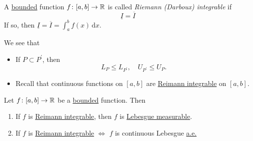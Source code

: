 \begin{definition}\label{def:Riemann-integrable}
	A \underline{bounded} function \(f\colon [a, b]\to \mathbb{\MakeUppercase{r}} \) is called \emph{Riemann (Darboux) integrable}
	if
	\[
		\underline{I} = \overline{I}
	\]
	If so, then \(\underline{I} = \overline{I} = \int_{a}^{b} f(x) \,\mathrm{d}x\).
\end{definition}
\begin{note}
	We see that
	\begin{itemize}
		\item If \(P\subset P ^\prime \), then
		      \[
			      L_{P}\leq L_{P ^\prime },\quad U_{P ^\prime }\leq U_{P}.
		      \]
		\item Recall that continuous functions on \([a, b]\) are \hyperref[def:Riemann-integrable]{Reimann integrable} on \([a, b]\).
	\end{itemize}
\end{note}
\begin{theorem}
	Let \(f\colon [a, b]\to \mathbb{\MakeUppercase{r}} \) be a \underline{bounded} function. Then
	\begin{enumerate}
		\item If \(f\) is \hyperref[def:Riemann-integrable]{Reimann integrable}, then \(f\) is \hyperref[def:measurable-function]{Lebesgue measurable}.
		\item If \(f\) is \hyperref[def:Riemann-integrable]{Reimann integrable} \(\iff \) \(f\) is continuous Lebesgue \hyperref[def:mu-almost-everywhere]{a.e.}
	\end{enumerate}
\end{theorem}
